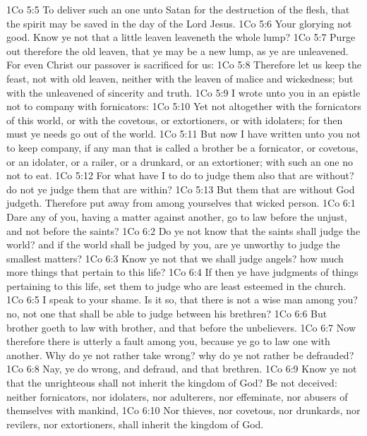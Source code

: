 \vs 1Co 5:5 To deliver such an one unto Satan for the destruction of the flesh, that the spirit may be saved in the day of the Lord Jesus.
\vs 1Co 5:6 Your glorying  not good. Know ye not that a little leaven leaveneth the whole lump?
\vs 1Co 5:7 Purge out therefore the old leaven, that ye may be a new lump, as ye are unleavened. For even Christ our passover is sacrificed for us:
\vs 1Co 5:8 Therefore let us keep the feast, not with old leaven, neither with the leaven of malice and wickedness; but with the unleavened  of sincerity and truth.
\vs 1Co 5:9 I wrote unto you in an epistle not to company with fornicators:
\vs 1Co 5:10 Yet not altogether with the fornicators of this world, or with the covetous, or extortioners, or with idolaters; for then must ye needs go out of the world.
\vs 1Co 5:11 But now I have written unto you not to keep company, if any man that is called a brother be a fornicator, or covetous, or an idolater, or a railer, or a drunkard, or an extortioner; with such an one no not to eat.
\vs 1Co 5:12 For what have I to do to judge them also that are without? do not ye judge them that are within?
\vs 1Co 5:13 But them that are without God judgeth. Therefore put away from among yourselves that wicked person.
\vs 1Co 6:1 Dare any of you, having a matter against another, go to law before the unjust, and not before the saints?
\vs 1Co 6:2 Do ye not know that the saints shall judge the world? and if the world shall be judged by you, are ye unworthy to judge the smallest matters?
\vs 1Co 6:3 Know ye not that we shall judge angels? how much more things that pertain to this life?
\vs 1Co 6:4 If then ye have judgments of things pertaining to this life, set them to judge who are least esteemed in the church.
\vs 1Co 6:5 I speak to your shame. Is it so, that there is not a wise man among you? no, not one that shall be able to judge between his brethren?
\vs 1Co 6:6 But brother goeth to law with brother, and that before the unbelievers.
\vs 1Co 6:7 Now therefore there is utterly a fault among you, because ye go to law one with another. Why do ye not rather take wrong? why do ye not rather  be defrauded?
\vs 1Co 6:8 Nay, ye do wrong, and defraud, and that  brethren.
\vs 1Co 6:9 Know ye not that the unrighteous shall not inherit the kingdom of God? Be not deceived: neither fornicators, nor idolaters, nor adulterers, nor effeminate, nor abusers of themselves with mankind,
\vs 1Co 6:10 Nor thieves, nor covetous, nor drunkards, nor revilers, nor extortioners, shall inherit the kingdom of God.
